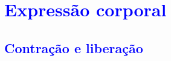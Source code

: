 

\chapter{\textcolor{blue}{ Expressão corporal}}

\section{\textcolor{blue}{ Contração e liberação}}

